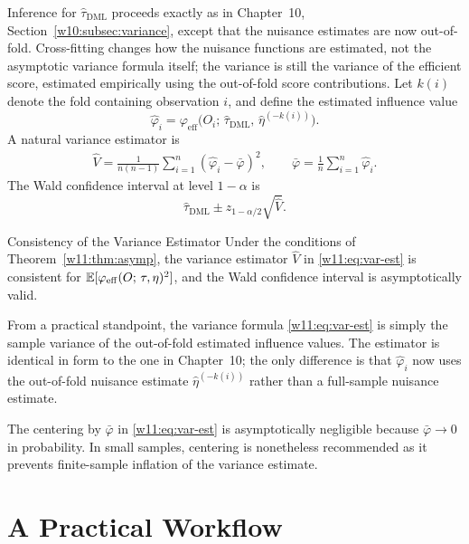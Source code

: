 \documentclass[master.tex]{subfiles}
\begin{document}
Inference for $\hat\tau_{\mathrm{DML}}$ proceeds exactly as in
Chapter~10, Section~\ref{w10:subsec:variance}, except that the
nuisance estimates are now out-of-fold.  Cross-fitting changes how
the nuisance functions are estimated, not the asymptotic variance
formula itself; the variance is still the variance of the efficient
score, estimated empirically using the out-of-fold score
contributions.  Let $k(i)$ denote the fold
containing observation $i$, and define the estimated influence value
\[
  \hat\varphi_i
  =
  \varphi_{\mathrm{eff}}\!\bigl(O_i;\,\hat\tau_{\mathrm{DML}},\,
  \hat\eta^{(-k(i))}\bigr).
\]
A natural variance estimator is
\begin{align}
  \hat{V}
  =
  \frac{1}{n(n-1)}\sum_{i=1}^n
  (\hat\varphi_i - \bar\varphi)^2,
  \qquad
  \bar\varphi = \frac{1}{n}\sum_{i=1}^n \hat\varphi_i.
  \label{w11:eq:var-est}
\end{align}
The Wald confidence interval at level $1 - \alpha$ is
\[
  \hat\tau_{\mathrm{DML}}
  \pm
  z_{1-\alpha/2}\sqrt{\hat{V}}.
\]

\begin{thm}{Consistency of the Variance Estimator}
\label{w11:thm:var}
Under the conditions of Theorem~\ref{w11:thm:asymp}, the variance
estimator $\hat{V}$ in \eqref{w11:eq:var-est} is consistent for
$\mathbb{E}[\varphi_{\mathrm{eff}}(O;\,\tau,\eta)^2]$, and the Wald
confidence interval is asymptotically valid.
\end{thm}

From a practical standpoint, the variance formula \eqref{w11:eq:var-est}
is simply the sample variance of the out-of-fold estimated influence
values.  The estimator is identical in form to the one in
Chapter~10; the only difference is that $\hat\varphi_i$ now uses
the out-of-fold nuisance estimate $\hat\eta^{(-k(i))}$ rather
than a full-sample nuisance estimate.

\begin{remark}
\label{w11:rem:var-centering}
The centering by $\bar\varphi$ in \eqref{w11:eq:var-est} is
asymptotically negligible because $\bar\varphi \to 0$ in
probability.  In small samples, centering is nonetheless
recommended as it prevents finite-sample inflation of the
variance estimate.
\end{remark}


\section{A Practical Workflow}
\label{w11:sec:workflow}
\end{document}

